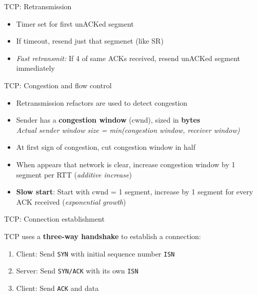 \begin{theorem}
    {TCP: Retransmission}
    \begin{itemize}
        \item Timer set for first unACKed segment
        \item If timeout, resend just that segmenet (like SR)
        \item \textit{Fast retransmit:} If 4 of same ACKs received, resend unACKed segment immediately
    \end{itemize}
\end{theorem}

\begin{theorem}
    {TCP: Congestion and flow control}

    \begin{itemize}
        \item Retransmission refactors are used to detect congestion
        \item Sender has a \textbf{congestion window} (cwnd), sized in \textbf{bytes}
              \\ \textit{Actual sender window size = min(congestion window, receiver window)}
        \item At first sign of congestion, cut congestion window in half
        \item When appears that network is clear, increase congestion window by 1 segment per RTT (\textit{additive increase})
        \item \textbf{Slow start}: Start with cwnd = 1 segment, increase by 1 segment for every ACK received (\textit{exponential growth})
    \end{itemize}
\end{theorem}


\label{sec:m04-l08}
\begin{theorem}
    {TCP: Connection establishment}

    TCP uses a \textbf{three-way handshake} to establish a connection:

    \begin{enumerate}
        \item Client: Send \texttt{SYN} with initial sequence number \texttt{ISN}
        \item Server: Send \texttt{SYN/ACK} with its own \texttt{ISN}
        \item Client: Send \texttt{ACK} and data
    \end{enumerate}
\end{theorem}

